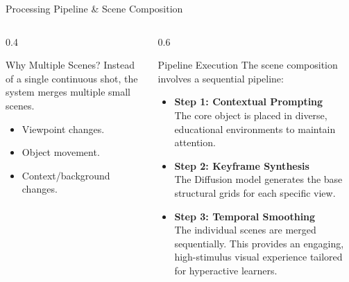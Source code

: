 \documentclass[aspectratio=169]{beamer}
\begin{document}
\begin{frame}{Processing Pipeline \& Scene Composition}
    \vspace{-0.2cm}
    \begin{columns}
        \begin{column}{0.4\textwidth}
            \begin{block}{Why Multiple Scenes?}
                Instead of a single continuous shot, the system merges multiple small scenes.
            \end{block}
            \begin{itemize}
                \item Viewpoint changes.
                \item Object movement.
                \item Context/background changes.
            \end{itemize}
        \end{column}
        \begin{column}{0.6\textwidth}
            \begin{block}{Pipeline Execution}
                The scene composition involves a sequential pipeline:
            \end{block}
            \begin{itemize}
                \item \textbf{Step 1: Contextual Prompting} \\
                The core object is placed in diverse, educational environments to maintain attention.
                \item \textbf{Step 2: Keyframe Synthesis} \\
                The Diffusion model generates the base structural grids for each specific view.
                \item \textbf{Step 3: Temporal Smoothing} \\
                The individual scenes are merged sequentially. This provides an engaging, high-stimulus visual experience tailored for hyperactive learners.
            \end{itemize}
        \end{column}
    \end{columns}
\end{frame}
\end{document}
